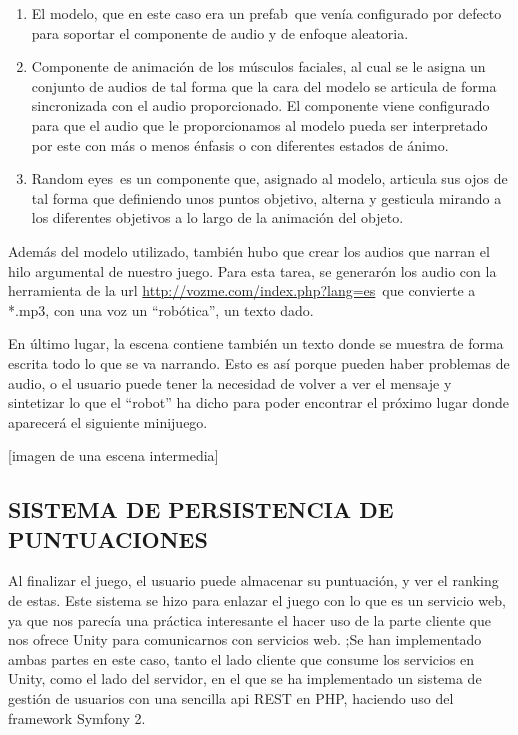 \begin{enumerate}
\def\labelenumi{\arabic{enumi}.}
\itemsep1pt\parskip0pt
\item
  El modelo, que en este caso era un prefab~que venía configurado por
  defecto para soportar el componente de audio y de enfoque aleatoria.
\item
  Componente de animación de los músculos faciales, al cual se le asigna
  un conjunto de audios de tal forma que la cara del modelo se articula
  de forma sincronizada con el audio proporcionado. El componente viene
  configurado para que el audio que le proporcionamos al modelo pueda
  ser interpretado por este con más o menos énfasis o con diferentes
  estados de ánimo.
\item
  Random eyes~es un componente que, asignado al modelo, articula sus
  ojos de tal forma que definiendo unos puntos objetivo, alterna y
  gesticula mirando a los diferentes objetivos a lo largo de la
  animación del objeto.
\end{enumerate}

Además del modelo utilizado, también hubo que crear los audios que
narran el hilo argumental de nuestro juego. Para esta tarea, se
generarón los audio con la herramienta de la url
\href{https://www.google.com/url?q=http://vozme.com/index.php?lang\%3Des\&sa=D\&ust=1464634042357000\&usg=AFQjCNEA_3BX58Z94ki6b1o_kIEjPNZW2g}{http://vozme.com/index.php?lang=es}~que
convierte a *.mp3, con una voz un ``robótica'', un texto dado.

En último lugar, la escena contiene también un texto donde se muestra de
forma escrita todo lo que se va narrando. Esto es así porque pueden
haber problemas de audio, o el usuario puede tener la necesidad de
volver a ver el mensaje y sintetizar lo que el ``robot'' ha dicho para
poder encontrar el próximo lugar donde aparecerá el siguiente minijuego.

{[}imagen de una escena intermedia{]}

\subsection{SISTEMA DE PERSISTENCIA DE
PUNTUACIONES}\label{h.es5w8jt0xlk6}

Al finalizar el juego, el usuario puede almacenar su puntuación, y ver
el ranking de estas. Este sistema se hizo para enlazar el juego con lo
que es un servicio web, ya que nos parecía una práctica interesante el
hacer uso de la parte cliente que nos ofrece Unity para comunicarnos con
servicios web. ;Se han implementado ambas partes en este caso, tanto el
lado cliente que consume los servicios en Unity, como el lado del
servidor, en el que se ha implementado un sistema de gestión de usuarios
con una sencilla api REST en PHP, haciendo uso del framework Symfony 2.

